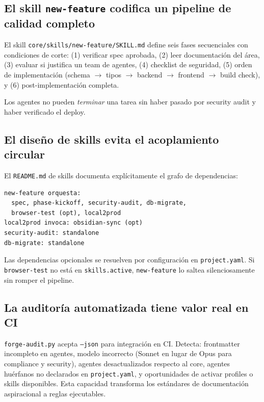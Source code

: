 \documentclass[12pt,a4paper]{article}
\begin{document}
\subsection{El skill \texttt{new-feature} codifica un pipeline de calidad completo}

El skill \texttt{core/skills/new-feature/SKILL.md} define seis fases secuenciales
con condiciones de corte: (1) verificar spec aprobada, (2) leer documentación del
área, (3) evaluar si justifica un team de agentes, (4) checklist de seguridad,
(5) orden de implementación (schema $\rightarrow$ tipos $\rightarrow$ backend
$\rightarrow$ frontend $\rightarrow$ build check), y (6) post-implementación completa.

Los agentes no pueden \textit{terminar} una tarea sin haber pasado por security audit
y haber verificado el deploy.

\subsection{El diseño de skills evita el acoplamiento circular}

El \texttt{README.md} de skills documenta explícitamente el grafo de dependencias:

\begin{lstlisting}[caption={Grafo de dependencias de skills}]
new-feature orquesta:
  spec, phase-kickoff, security-audit, db-migrate,
  browser-test (opt), local2prod
local2prod invoca: obsidian-sync (opt)
security-audit: standalone
db-migrate: standalone
\end{lstlisting}

Las dependencias opcionales se resuelven por configuración en \texttt{project.yaml}.
Si \texttt{browser-test} no está en \texttt{skills.active}, \texttt{new-feature}
lo saltea silenciosamente sin romper el pipeline.

\subsection{La auditoría automatizada tiene valor real en CI}

\texttt{forge-audit.py} acepta \texttt{--json} para integración en CI. Detecta:
frontmatter incompleto en agentes, modelo incorrecto (Sonnet en lugar de Opus para
compliance y security), agentes desactualizados respecto al core, agentes huérfanos
no declarados en \texttt{project.yaml}, y oportunidades de activar profiles o skills
disponibles. Esta capacidad transforma los estándares de documentación aspiracional
a reglas ejecutables.
\end{document}
